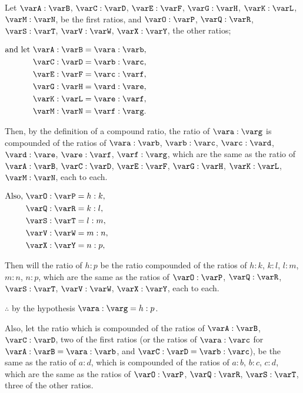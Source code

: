\documentclass[booklanguage=english]{byrnebook}
\begin{document}
Let $\varA : \varB$, $\varC : \varD$, $\varE : \varF$, $\varG : \varH$, $\varK : \varL$, $\varM : \varN$, be the first ratios, and $\varO : \varP$, $\varQ : \varR$, $\varS : \varT$, $\varV : \varW$, $\varX : \varY$, the other ratios;

\begin{center}
$\begin{aligned}
\mbox{and let }
\varA : \varB &= \vara : \varb ,\\
\varC : \varD &= \varb : \varc ,\\
\varE : \varF &= \varc : \varf ,\\
\varG : \varH &= \vard : \vare ,\\
\varK : \varL &= \vare : \varf ,\\
\varM : \varN &= \varf : \varg .
\end{aligned}$
\end{center}

Then, by the definition of a compound ratio, the ratio of $\vara : \varg$ is compounded of the ratios of $\vara : \varb$, $\varb : \varc$, $\varc : \vard$, $\vard : \vare$, $\vare : \varf$, $\varf : \varg$, which are the same as the ratio of $\varA : \varB$, $\varC : \varD$, $\varE : \varF$, $\varG : \varH$, $\varK : \varL$, $\varM : \varN$, each to each.

\begin{center}
$\begin{aligned}
\mbox{Also, }
\varO : \varP &= h : k ,\\
\varQ : \varR &= k : l ,\\
\varS : \varT &= l : m ,\\
\varV : \varW &= m : n ,\\
\varX : \varY &= n : p ,\\
\end{aligned}$
\end{center}

Then will the ratio of $h : p$ be the ratio compounded of the ratios of $h : k$, $k : l$, $l : m$, $m : n$, $n : p$, which are the same as the ratios of $\varO : \varP$, $\varQ : \varR$, $\varS : \varT$, $\varV : \varW$, $\varX : \varY$, each to each.

\begin{center}
$\therefore$ by the hypothesis $\vara : \varg = h : p$.
\end{center}

Also, let the ratio which is compounded of the ratios of $\varA : \varB$, $\varC : \varD$, two of the first ratios (or the ratios of $\vara : \varc$ for $\varA : \varB = \vara : \varb$, and $\varC : \varD = \varb : \varc$), be the same as the ratio of $a : d$, which is compounded of the ratios of $a : b$, $b : c$, $c : d$, which are the same as the ratios of $\varO : \varP$, $\varQ : \varR$, $\varS : \varT$, three of the other ratios.
\end{document}
